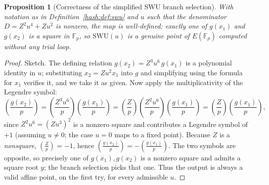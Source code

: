 \documentclass[11pt,a4paper]{article}
\newtheorem{proposition}[theorem]{Proposition}
\theoremstyle{definition}
\theoremstyle{remark}
\newcommand{\Fp}{\ensuremath{\mathbb{F}_{p}}}
\newcommand{\legendre}[2]{\left(\frac{#1}{#2}\right)}
\begin{document}
\begin{proposition}[Correctness of the simplified SWU branch selection]\label{hash:prop:swu}
With notation as in Definition~\ref{hash:def:swu} and \(u\) such that the denominator \(D = Z^{2}u^{4} + Zu^{2}\) is nonzero, the map is well-defined: exactly one of \(g(x_{1})\) and \(g(x_{2})\) is a square in \(\Fp\), so \(\mathrm{SWU}(u)\) is a genuine point of \(E(\Fp)\) computed without any trial loop.
\end{proposition}

\begin{proof}
Sketch. The defining relation \(g(x_{2}) = Z^{3}u^{6}\,g(x_{1})\) is a polynomial identity in \(u\); substituting \(x_{2} = Zu^{2}x_{1}\) into \(g\) and simplifying using the formula for \(x_{1}\) verifies it, and we take it as given. Now apply the multiplicativity of the Legendre symbol:
\[
  \legendre{g(x_{2})}{p}
  = \legendre{Z^{3}u^{6}}{p}\legendre{g(x_{1})}{p}
  = \legendre{Z}{p}\legendre{Z^{2}u^{6}}{p}\legendre{g(x_{1})}{p}
  = \legendre{Z}{p}\legendre{g(x_{1})}{p},
\]
since \(Z^{2}u^{6} = (Zu^{3})^{2}\) is a nonzero square and contributes a Legendre symbol of \(+1\) (assuming \(u \neq 0\); the case \(u=0\) maps to a fixed point). Because \(Z\) is a \emph{nonsquare}, \(\legendre{Z}{p} = -1\), hence \(\legendre{g(x_{2})}{p} = -\legendre{g(x_{1})}{p}\). The two symbols are opposite, so precisely one of \(g(x_{1}), g(x_{2})\) is a nonzero square and admits a square root \(y\); the branch selection picks that one. Thus the output is always a valid affine point, on the first try, for every admissible \(u\).
\end{proof}
\end{document}
